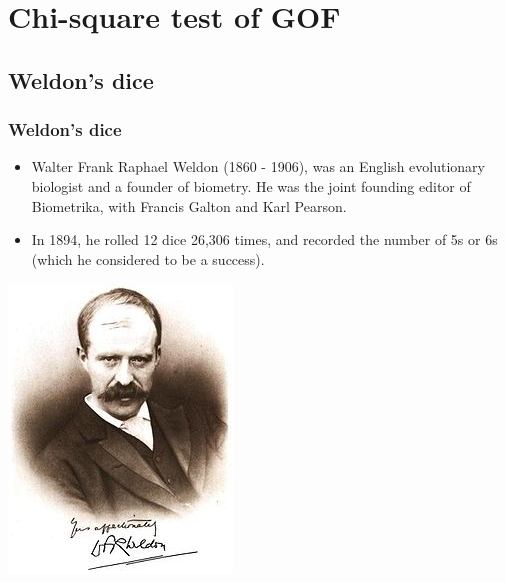 
\section{Chi-square test of GOF}


\subsection{Weldon's dice}


\begin{frame}
\frametitle{Weldon's dice}

{
\begin{itemize}

\item Walter Frank Raphael Weldon (1860 - 1906), was an English evolutionary biologist and a founder of biometry. He was the joint founding editor of Biometrika, with Francis Galton and Karl Pearson.

\item In 1894, he rolled 12 dice 26,306 times, and recorded the number of 5s or 6s (which he considered to be a success).

\end{itemize}
}
{
\begin{center}
\includegraphics[width=\textwidth]{6-3_chisq_gof/figures/dice/weldon}
\end{center}
}
\begin{itemize}


\end{itemize}
\end{frame}
